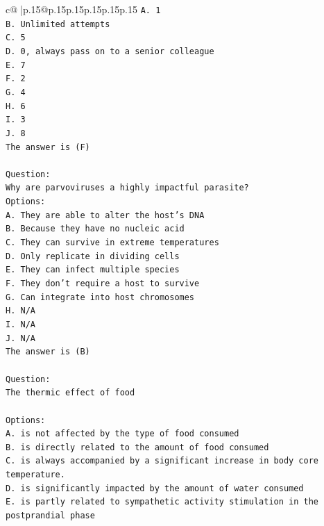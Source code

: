 \documentclass{article}
\begin{document}
{\begin{supertabular}{c@{$\;$}|p{.15\linewidth}@{}p{.15\linewidth}p{.15\linewidth}p{.15\linewidth}p{.15\linewidth}p{.15\linewidth}}
{{{\texttt{A. 1} \\
\texttt{B. Unlimited attempts} \\
\texttt{C. 5} \\
\texttt{D. 0, always pass on to a senior colleague} \\
\texttt{E. 7} \\
\texttt{F. 2} \\
\texttt{G. 4} \\
\texttt{H. 6} \\
\texttt{I. 3} \\
\texttt{J. 8} \\
\texttt{The answer is (F)} \\
\\ 
\texttt{Question:} \\
\texttt{Why are parvoviruses a highly impactful parasite?} \\
\texttt{Options:} \\
\texttt{A. They are able to alter the host's DNA} \\
\texttt{B. Because they have no nucleic acid} \\
\texttt{C. They can survive in extreme temperatures} \\
\texttt{D. Only replicate in dividing cells} \\
\texttt{E. They can infect multiple species} \\
\texttt{F. They don't require a host to survive} \\
\texttt{G. Can integrate into host chromosomes} \\
\texttt{H. N/A} \\
\texttt{I. N/A} \\
\texttt{J. N/A} \\
\texttt{The answer is (B)} \\
\\ 
\texttt{Question:} \\
\texttt{The thermic effect of food} \\
\\ 
\texttt{Options:} \\
\texttt{A. is not affected by the type of food consumed} \\
\texttt{B. is directly related to the amount of food consumed} \\
\texttt{C. is always accompanied by a significant increase in body core temperature.} \\
\texttt{D. is significantly impacted by the amount of water consumed} \\
\texttt{E. is partly related to sympathetic activity stimulation in the postprandial phase} \\
}}}
\end{supertabular}}
\end{document}

